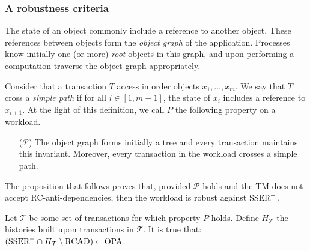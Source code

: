 \subsubsection{A robustness criteria}

The state of an object commonly include a reference to another object.
These references between objects form the \emph{object graph} of the application.
Processes know initially one (or more) \emph{root} objects in this graph, and upon performing a computation traverse the object graph appropriately.

Consider that a transaction $T$ access in order objects $x_1, \ldots, x_m$.
We say that $T$ cross a \emph{simple path} if for all $i \in [1,m-1]$, the state of $x_i$ includes a reference to $x_{i+1}$.
At the light of this definition, we call $P$ the following property on a workload.

\begin{itemize}
\item[($\mathcal{P}$)]
  The object graph forms initially a tree and every transaction maintains this invariant.
  Moreover, every transaction in the workload crosses a simple path.
\end{itemize}

The proposition that follows proves that, provided $\mathcal{P}$ holds and the TM does not accept RC-anti-dependencies, then the workload is robust against $\SPSER$.

\begin{proposition}
  Let $\mathcal{T}$ be some set of transactions for which property $P$ holds.
  Define $H_{\mathcal{T}}$ the histories built upon transactions in $\mathcal{T}$.
  It is true that: $(\SPSER \inter H_{\mathcal{T}} \setminus \RCAD) \subset \OPA$.
\end{proposition}

